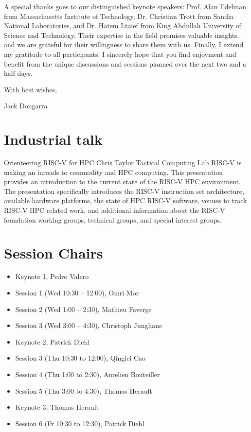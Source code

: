 \documentclass[12pt,letterpaper]{book}
\newenvironment{conf-abstract}[4][]{
 \needspace{10\baselineskip}
 \begin{center}
 { \renewcommand\textsuperscript[1]{}
 \phantomsection\addcontentsline{toc}{section}
 {\texorpdfstring{#2 (\emph{#3})}{#2 (#3)}}
 }
 {{\large\bfseries #2}\marginnote{#1}\par}
 \medskip
 {#3\par}
 \smallskip
 {\small #4\par}
 \end{center}
}{%
 \bigskip
 \hrule
 \bigskip
}
\begin{document}
\noindent A special thanks goes to our distinguished keynote speakers: Prof. Alan Edelman
from Massachusetts Institute of Technology, Dr. Christian Trott from Sandia National Laboratories,
and Dr. Hatem Ltaief from King Abdullah University of Science and Technology. 
Their expertise in the field promises valuable insights, and we are
grateful for their willingness to share them with us. Finally, I extend
my gratitude to all participants. I sincerely hope that you find
enjoyment and benefit from the unique discussions and sessions planned
over the next two and a half days.

\noindent With best wishes,

Jack Dongarra


%

\newpage



\tableofcontents

\mainmatter

\chapter{Industrial talk}

\begin{conf-abstract}[20$^{th}$]
{Orienteering RISC-V for HPC}
{Chris Taylor}
{Tactical Computing Lab}
RISC-V is making an inroads to commodity and HPC computing. This presentation provides an introduction to the current state of the RISC-V HPC environment. The presentation specifically introduces the RISC-V instruction set architecture, available hardware platforms, the state of HPC RISC-V software, venues to track RISC-V HPC related work, and additional information about the RISC-V foundation working groups, technical groups, and special interest groups.
\end{conf-abstract}

\chapter{Session Chairs}

\begin{itemize}
\item Keynote 1, Pedro Valero
\item Session 1 (Wed 10:30 -- 12:00), Omri Mor
\item Session 2 (Wed 1:00 -- 2:30),  Mathieu Faverge
\item Session 3 (Wed 3:00 -- 4:30), Christoph Junghans
\item Keynote 2, Patrick Diehl
\item Session 3 (Thu 10:30 to 12:00), Qinglei Cao
\item Session 4 (Thu 1:00 to 2:30), Aurelien Bouteiller
\item Session 5 (Thu 3:00 to 4:30), Thomas Herault
\item Keynote 3, Thomas Herault
\item Session 6 (Fr 10:30 to 12:30), Patrick Diehl
\end{itemize}
\end{document}
